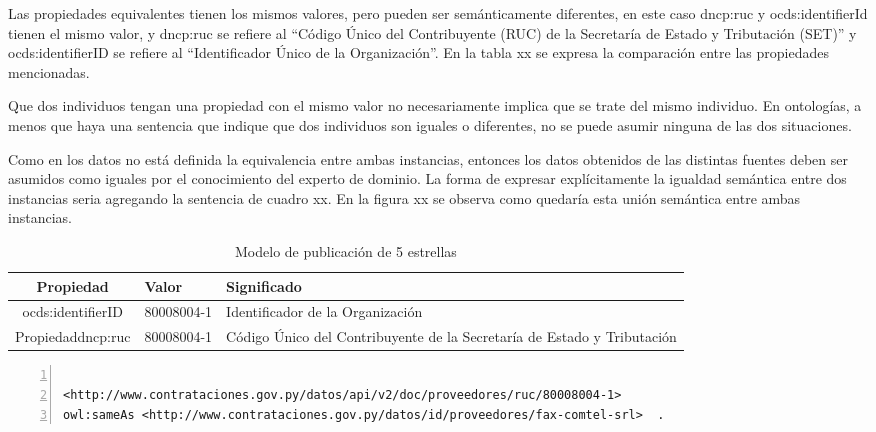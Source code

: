  Las propiedades equivalentes tienen los mismos valores, pero pueden ser semánticamente diferentes, en este caso dncp:ruc y ocds:identifierId tienen el mismo valor, y dncp:ruc se refiere al “Código Único del Contribuyente (RUC) de la Secretaría de Estado y Tributación (SET)” y ocds:identifierID se refiere al “Identificador Único de la Organización”. En la tabla xx se expresa la comparación entre las propiedades mencionadas.

 Que dos individuos tengan una propiedad con el mismo valor no necesariamente implica que se trate del mismo individuo. En ontologías, a menos que haya una sentencia que indique que dos individuos son iguales o diferentes, no se puede asumir ninguna de las dos situaciones. 

 Como en los datos no está definida la equivalencia entre ambas instancias, entonces los datos obtenidos de las distintas fuentes deben ser asumidos como iguales por el conocimiento del experto de dominio. La forma de expresar explícitamente la igualdad semántica entre dos instancias seria agregando la sentencia de cuadro xx. En la figura xx se observa como quedaría esta unión semántica entre ambas instancias.
 


 \begin{table}[]
    \centering
    \caption{Modelo de publicación de 5 estrellas}
    \label{modelo-5-estrellas}
    \resizebox{15cm}{!} {
    \begin{tabular}{|c|l|l|}
    \hline
    
Propiedad & Valor &  Significado \\ \hline

ocds:identifierID  & 80008004-1 &  Identificador de la Organización \\ \hline
Propiedaddncp:ruc & 80008004-1 &  Código Único del Contribuyente de la Secretaría de Estado y Tributación \\ \hline

    \end{tabular}
    }
    \end{table}



    \begin{lstlisting}[captionpos=b, caption=Información referente al proceso licitatorio cuyo identificacor es, label=lst:caso1,  numbers=left,  numberstyle=\tiny\color{mygray},
        basicstyle=\ttfamily,frame=single]

<http://www.contrataciones.gov.py/datos/api/v2/doc/proveedores/ruc/80008004-1> 
owl:sameAs <http://www.contrataciones.gov.py/datos/id/proveedores/fax-comtel-srl>  .

     \end{lstlisting}

